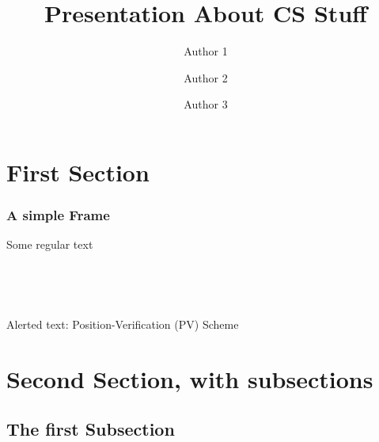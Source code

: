 \documentclass[t]{beamer}
\begin{document}
\title{Presentation About CS Stuff}
\author[A1, A2, and A3]{Author 1\and Author 2 \and Author 3}
\begin{frame}
\titlepage
\end{frame}



\section{First Section}



\begin{frame}\frametitle{A simple Frame}
Some regular text 


\ 


\ 

Alerted text: 
\alert{Position-Verification (PV) Scheme}


\end{frame}



\section{Second Section, with subsections}
\subsection{The first Subsection}
\end{document}
